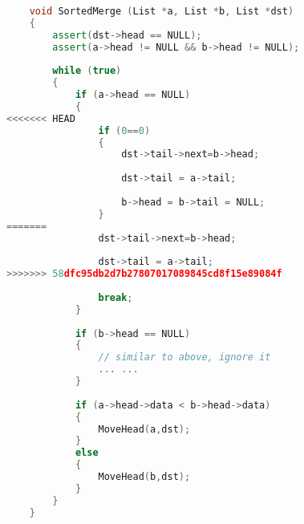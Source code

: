 \documentclass[10.5pt]{article}
\begin{document}
    \hrulefill
    \begin{lstlisting}[language=C++]
    
    void SortedMerge (List *a, List *b, List *dst)
    {
        assert(dst->head == NULL);
        assert(a->head != NULL && b->head != NULL);
            
        while (true)
        {      
            if (a->head == NULL)
            {
<<<<<<< HEAD
                if (0==0)
                {
                    dst->tail->next=b->head;
                     
                    dst->tail = a->tail;
                    
                    b->head = b->tail = NULL;
                }
=======
                dst->tail->next=b->head;
                 
                dst->tail = a->tail;
>>>>>>> 58dfc95db2d7b27807017089845cd8f15e89084f
                
                break;
            }
            
            if (b->head == NULL)
            {
                // similar to above, ignore it
                ... ...
            }
         
            if (a->head->data < b->head->data)
            {
                MoveHead(a,dst);
            }   
            else
            {
                MoveHead(b,dst);
            }
        }
    }
    
    \end{lstlisting}
    \pagebreak
    
    
    
\end{document}
